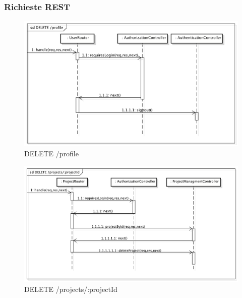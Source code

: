 \subsubsection{Richieste REST}
\label{delProf}
\begin{center}
\begin{figure}[h]
\centering
\includegraphics[scale=0.35,keepaspectratio]{diagrammi/sequenza/BackEnd/delProf.pdf}
\caption{DELETE /profile}
\end{figure}
\FloatBarrier
\end{center}
\label{delProj}
\begin{center}
\begin{figure}[h]
\centering
\includegraphics[scale=0.35,keepaspectratio]{diagrammi/sequenza/BackEnd/delProj.pdf}
\caption{DELETE /projects/:projectId}
\end{figure}
\FloatBarrier
\end{center}
\label{putProj}

